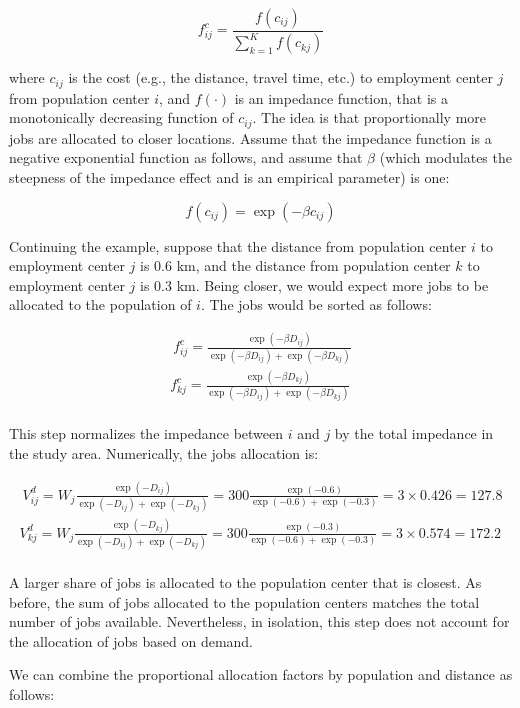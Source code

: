 \documentclass[]{elsarticle} %
\begin{document}
\[
f^c_{ij} = \frac{f(c_{ij})}{\sum_{k=1}^K f(c_{kj})}
\]

\noindent where \(c_{ij}\) is the cost (e.g., the distance, travel time,
etc.) to employment center \(j\) from population center \(i\), and
\(f(\cdot)\) is an impedance function, that is a monotonically
decreasing function of \(c_{ij}\). The idea is that proportionally more
jobs are allocated to closer locations. Assume that the impedance
function is a negative exponential function as follows, and assume that
\(\beta\) (which modulates the steepness of the impedance effect and is
an empirical parameter) is one:

\[
f(c_{ij}) = \exp(-\beta c_{ij})
\]

Continuing the example, suppose that the distance from population center
\(i\) to employment center \(j\) is 0.6 km, and the distance from
population center \(k\) to employment center \(j\) is 0.3 km. Being
closer, we would expect more jobs to be allocated to the population of
\(i\). The jobs would be sorted as follows:

\[
\begin{array}{l}\
f^c_{ij} = \frac{\exp(-\beta D_{ij})}{\exp(-\beta D_{ij}) + \exp(-\beta D_{kj})}\\
f^c_{kj} = \frac{\exp(-\beta D_{kj})}{\exp(-\beta D_{ij}) + \exp(-\beta D_{kj})}\\
\end{array}
\]

This step normalizes the impedance between \(i\) and \(j\) by the total
impedance in the study area. Numerically, the jobs allocation is:

\[
\begin{array}{l}\
V^d_{ij} = W_j\frac{\exp(-D_{ij})}{\exp(-D_{ij}) + \exp(-D_{kj})} = 300\frac{\exp(-0.6)}{\exp(-0.6) + \exp(-0.3)} = 3\times 0.426 = 127.8\\
V^d_{kj} = W_j\frac{\exp(-D_{kj})}{\exp(-D_{ij}) + \exp(-D_{kj})} = 300\frac{\exp(-0.3)}{\exp(-0.6) + \exp(-0.3)} = 3\times  0.574 = 172.2\\
\end{array}
\]

A larger share of jobs is allocated to the population center that is
closest. As before, the sum of jobs allocated to the population centers
matches the total number of jobs available. Nevertheless, in isolation,
this step does not account for the allocation of jobs based on demand.

We can combine the proportional allocation factors by population and
distance as follows:
\end{document}

